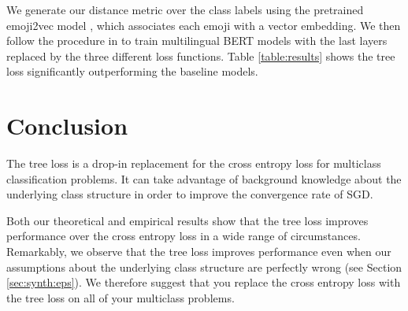 \documentclass[twoside]{article}
\begin{document}
We generate our distance metric over the class labels using the pretrained emoji2vec model \citep{Eisner2016emoji2vecLE},
which associates each emoji with a vector embedding.
We then follow the procedure in \citet{stoikos2020multilingual} to train multilingual BERT models \citep{Feng2020LanguageagnosticBS} with the last layers replaced by the three different loss functions.
Table \ref{table:results} shows the tree loss significantly outperforming the baseline models.

\section{Conclusion}
The tree loss is a drop-in replacement for the cross entropy loss for multiclass classification problems.
It can take advantage of background knowledge about the underlying class structure in order to improve the convergence rate of SGD.

Both our theoretical and empirical results show that the tree loss improves performance over the cross entropy loss in a wide range of circumstances.
Remarkably, we observe that the tree loss improves performance even when our assumptions about the underlying class structure are perfectly wrong (see Section \ref{sec:synth:eps}).
We therefore suggest that you replace the cross entropy loss with the tree loss on all of your multiclass problems.


\newpage


\end{document}

